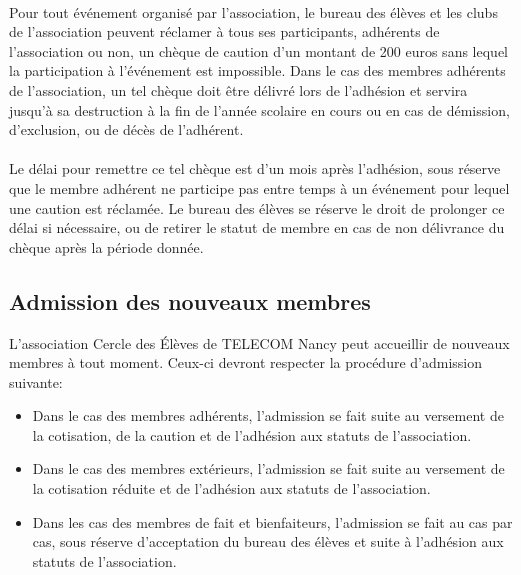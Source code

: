 \documentclass{article} %
\begin{document}
            \paragraph{}
			Pour tout événement organisé par l'association, le bureau des élèves et les
			clubs de l’association peuvent réclamer à tous ses participants,
			adhérents de l’association ou non, un chèque de caution d’un montant
			de 200 euros sans lequel la participation à l’événement est
			impossible. Dans le cas des membres adhérents de l’association, un
			tel chèque doit être délivré lors de l’adhésion et servira jusqu’à
			sa destruction à la fin de l’année scolaire en cours ou en cas de
			démission, d’exclusion, ou de décès de l’adhérent. 

            \paragraph{}
			Le délai pour remettre ce tel chèque est d’un mois après l’adhésion,
			sous réserve que le membre adhérent ne participe pas entre temps à
			un événement pour lequel une caution est réclamée. Le bureau des
			élèves se réserve le droit de prolonger ce délai si nécessaire, ou
			de retirer le statut de membre en cas de non délivrance du chèque
			après la période donnée. 

		\subsection{Admission des nouveaux membres}
\label{sub:admission_des_nouveaux_membres}

			L’association Cercle des Élèves de TELECOM Nancy peut accueillir de
			nouveaux membres à tout moment. Ceux-ci devront respecter la
			procédure d’admission suivante:
			\begin{itemize}
				\item Dans le cas des membres adhérents, l’admission se fait
					suite au versement de la cotisation, de la caution et de
					l’adhésion aux statuts de l’association.
				\item Dans le cas des membres extérieurs, l’admission se fait
					suite au versement de la cotisation réduite et de l’adhésion
					aux statuts de l’association.
				\item Dans les cas des membres de fait et bienfaiteurs, 
				l’admission se fait au cas par cas, sous réserve d'acceptation du 
				bureau des élèves et suite à l'adhésion aux statuts de l'association.
			\end{itemize}
\end{document}

